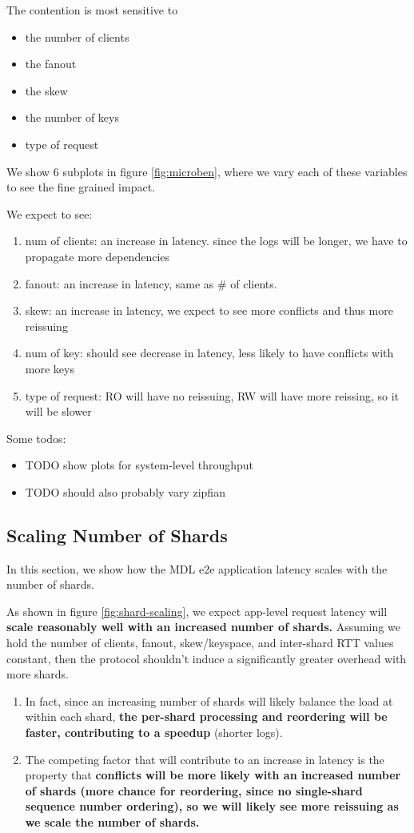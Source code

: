 The contention is most sensitive to
\begin{itemize}
    \item the number of clients
    \item the fanout
    \item the skew
    \item the number of keys
    \item type of request
\end{itemize}

We show 6 subplots in figure \ref{fig:microben}, where we vary each of these variables to see the fine grained impact.

We expect to see:
\begin{enumerate}
    \item num of clients: an increase in latency. since the logs will be longer, we have to propagate more dependencies
    \item fanout: an increase in latency, same as # of clients.
    \item skew: an increase in latency, we expect to see more conflicts and thus more reissuing
    \item num of key: should see decrease in latency, less likely to have conflicts with more keys
    \item type of request: RO will have no reissuing, RW will have more reissing, so it will be slower
\end{enumerate}

Some todos:
\begin{itemize}
    \item TODO show plots for system-level throughput
    \item TODO should also probably vary zipfian
\end{itemize}

\subsection{Scaling Number of Shards}
In this section, we show how the MDL e2e application latency scales with the number of shards. 

As shown in figure \ref{fig:shard-scaling}, we expect app-level request latency will \textbf{scale reasonably well with an increased number of shards.} Assuming we hold the number of clients, fanout, skew/keyspace, and inter-shard RTT values constant, then the protocol shouldn't induce a significantly greater overhead with more shards. 
\begin{enumerate}
    \item In fact, since an increasing number of shards will likely balance the load at within each shard, \textbf{the per-shard processing and reordering will be faster, contributing to a speedup} (shorter logs). 
    \item The competing factor that will contribute to an increase in latency is the property that \textbf{conflicts will be more likely with an increased number of shards (more chance for reordering, since no single-shard sequence number ordering), so we will likely see more reissuing as we scale the number of shards.}
\end{enumerate}


